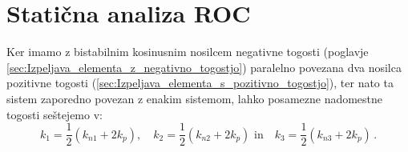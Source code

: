     
    \newpage
    \section{Statična analiza ROC}\label{sec:staticna_analiza_ROC}
        
        Ker imamo z bistabilnim kosinusnim nosilcem negativne togosti (poglavje \ref{sec:Izpeljava_elementa_z_negativno_togostjo}) paralelno povezana dva nosilca pozitivne togosti (\ref{sec:Izpeljava_elementa_s_pozitivno_togostjo}), ter nato ta sistem zaporedno povezan z enakim sistemom, lahko posamezne nadomestne togosti seštejemo v: 
        \begin{equation}\label{eq:k1k2k3}
            k_1=\frac{1}{2} ( k_{n 1}+2 k_p ), \quad k_2=\frac{1}{2} ( k_{n 2}+2 k_p ) \text{ in} \quad k_3=\frac{1}{2} ( k_{n 3}+2 k_p ) \,.
        \end{equation}
        
